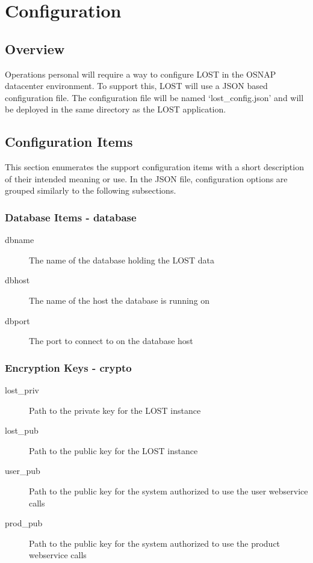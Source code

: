 \chapter*{Configuration}
\section*{Overview}
Operations personal will require a way to configure LOST in the OSNAP datacenter environment. To support this, LOST will use a JSON based configuration file. The configuration file will be named `lost\_config.json' and will be deployed in the same directory as the LOST application.

\section*{Configuration Items}
This section enumerates the support configuration items with a short description of their intended meaning or use. In the JSON file, configuration options are grouped similarly to the following subsections.

\subsection*{Database Items - database}
\begin{description}
\item[dbname] The name of the database holding the LOST data
\item[dbhost] The name of the host the database is running on
\item[dbport] The port to connect to on the database host
\end{description}

\subsection*{Encryption Keys - crypto}
\begin{description}
\item[lost\_priv] Path to the private key for the LOST instance
\item[lost\_pub]  Path to the public key for the LOST instance
\item[user\_pub]  Path to the public key for the system authorized to use the user webservice calls
\item[prod\_pub]  Path to the public key for the system authorized to use the product webservice calls
\end{description}

